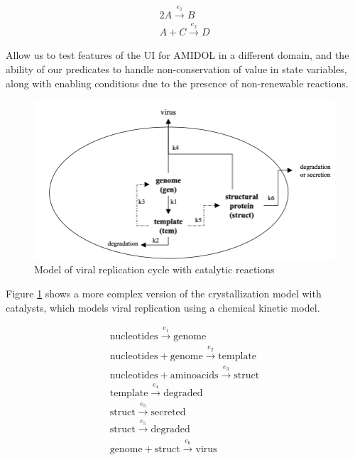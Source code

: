 \documentclass[11pt]{article}
\newcommand{\amidol}{\textsc{AMIDOL}}
\begin{document}
\begin{eqnarray}
  2A \overset{e_1}{\rightarrow} B\\
  A + C \overset{e_2}{\rightarrow} D
\end{eqnarray}

Allow us to test features of the UI for \amidol{} in a different domain, and the ability of our predicates to handle non-conservation of value in state variables, along with enabling conditions due to the presence of non-renewable reactions.

\begin{figure}
\includegraphics[width=\textwidth]{figs/ViralRep-Crop.png}
\caption{Model of viral replication cycle with catalytic reactions}
\label{Fig:ViralRep}
\end{figure}

Figure \ref{Fig:ViralRep} shows a more complex version of the crystallization model with catalysts, which models viral replication using a chemical kinetic model.

\begin{eqnarray}
\mathrm{nucleotides} \overset{e_1}{\rightarrow} \mathrm{genome}\\
\mathrm{nucleotides} + \mathrm{genome} \overset{e_2}{\rightarrow} \mathrm{template}\\
\mathrm{nucleotides} + \mathrm{aminoacids} \overset{e_3}{\rightarrow} \mathrm{struct}\\
\mathrm{template} \overset{e_4}{\rightarrow} \mathrm{degraded}\\
\mathrm{struct} \overset{e_5}{\rightarrow} \mathrm{secreted}\\
\mathrm{struct} \overset{e_5}{\rightarrow} \mathrm{degraded}\\
\mathrm{genome} + \mathrm{struct} \overset{e_6}{\rightarrow} \mathrm{virus}\\
\end{eqnarray}
\end{document}

